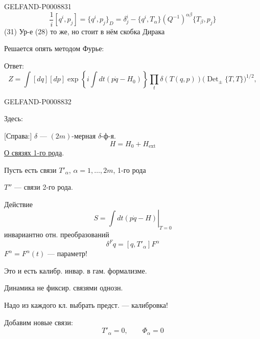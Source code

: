 \begin{GelfandAdjacentEvidence}{GELFAND-P000883}{1}
\begin{equation*}
\frac{1}{i}[q^i,p_j]=\{q^i,p_j\}_D
=\delta^i_j-\{q^i,T_\alpha\}(Q^{-1})^{\alpha\beta}\{T_\beta,p_j\}
\tag{30}
\end{equation*}
(31) Ур-е (28) то же, но стоит в нём скобка Дирака

Решается опять методом Фурье:

Ответ:
\begin{equation*}
Z=\int[dq][dp]\exp\left\{i\int dt(p\dot q-H_0)\right\}
\prod_t\delta(T(q,p))
\bigl(\operatorname{Det}_{\pm}\{T,T\}\bigr)^{1/2},
\tag{32}
\end{equation*}
\end{GelfandAdjacentEvidence}
\begin{GelfandAdjacentEvidence}{GELFAND-P000883}{2}


Здесь:

[Справа:] $\delta$ --- $(2m)$-мерная $\delta$-ф-я.
\begin{equation*}
H=H_0+H_{\mathrm{ext}}
\tag{33}
\end{equation*}
\uline{О связях 1-го рода}.

Пусть есть связи $T'_\alpha$, $\alpha=1,\ldots,2m$, 1-го рода

$T''$ --- связи 2-го рода.

Действие
\begin{equation*}
S=\left.\int dt(p\dot q-H)\right|_{T=0}
\tag{34}
\end{equation*}
инвариантно отн. преобразований
\begin{equation*}
\delta^F q=[q,T'_\alpha]F^\alpha
\tag{35}
\end{equation*}
$F^\alpha=F^\alpha(t)$ --- параметр!

Это и есть калибр. инвар. в гам. формализме.

Динамика не фиксир. связями однозн.

Надо из каждого кл. выбрать предст. --- калибровка!

Добавим новые связи:
\begin{equation*}
T'_\alpha=0,\qquad \Phi_\alpha=0
\tag{36}
\end{equation*}
\end{GelfandAdjacentEvidence}
